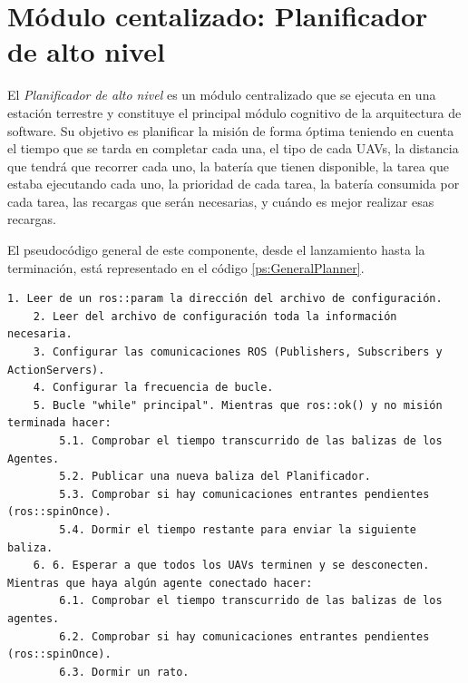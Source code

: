 \documentclass[fontsize=11pt, English=false, Español=true, Myfinal=true, twoside, numbers=noenddot]{scrbook}
\begin{document}
\section{Módulo centalizado: Planificador de alto nivel}
\label{sec:Centralised module:TaskPlanner}
El \emph{Planificador de alto nivel} es un módulo centralizado que se ejecuta en una estación terrestre y constituye el principal módulo cognitivo de la arquitectura de software. Su objetivo es planificar la misión de forma óptima teniendo en cuenta el tiempo que se tarda en completar cada una, el tipo de cada \glspl{UAV}, la distancia que tendrá que recorrer cada uno, la batería que tienen disponible, la tarea que estaba ejecutando cada uno, la prioridad de cada tarea, la batería consumida por cada tarea, las recargas que serán necesarias, y cuándo es mejor realizar esas recargas.

El pseudocódigo general de este componente, desde el lanzamiento hasta la terminación, está representado en el código \ref{ps:GeneralPlanner}.

\begin{lstlisting}[caption={Pseudocódigo del bloque Planificador de alto nivel}, breaklines=true, label=ps:GeneralPlanner]
  1. Leer de un ros::param la dirección del archivo de configuración.
	2. Leer del archivo de configuración toda la información necesaria.
	3. Configurar las comunicaciones ROS (Publishers, Subscribers y ActionServers).
	4. Configurar la frecuencia de bucle.
	5. Bucle "while" principal". Mientras que ros::ok() y no misión terminada hacer:
		5.1. Comprobar el tiempo transcurrido de las balizas de los Agentes.
		5.2. Publicar una nueva baliza del Planificador.
		5.3. Comprobar si hay comunicaciones entrantes pendientes (ros::spinOnce).
		5.4. Dormir el tiempo restante para enviar la siguiente baliza.
	6. 6. Esperar a que todos los UAVs terminen y se desconecten. Mientras que haya algún agente conectado hacer:
		6.1. Comprobar el tiempo transcurrido de las balizas de los agentes.
		6.2. Comprobar si hay comunicaciones entrantes pendientes (ros::spinOnce).
		6.3. Dormir un rato.
\end{lstlisting}

\end{document}
